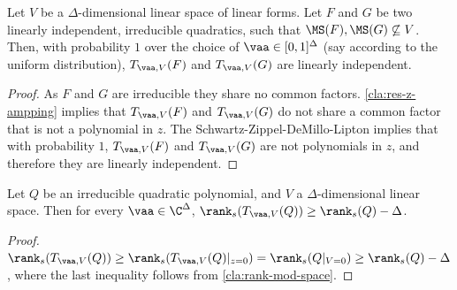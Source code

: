 \begin{corollary}\label{cla:still-indep}
	Let $V$ be a $\Delta$-dimensional linear space of linear forms. Let $F$ and  $G$ be two linearly independent, irreducible quadratics, such that $\MS(F),\MS(G)\not\subseteq V$. Then, with probability $1$ over the choice of $\vaa \in [0,1]^{\Delta}$ (say according to the uniform distribution), $T_{\vaa, V}(F)$ and $T_{\vaa, V}(G)$ are linearly independent.
\end{corollary}

\begin{proof}
	As $F$ and $G$ are irreducible  they share no common factors. \autoref{cla:res-z-ampping} implies that  $T_{\vaa, V}(F)$ and $T_{\vaa, V}(G)$ do not share a common factor that is not a polynomial in $z$.  The Schwartz-Zippel-DeMillo-Lipton implies that with probability $1$,   $T_{\vaa, V}(F)$ and $T_{\vaa, V}(G)$ are not polynomials in $z$, and therefore they are linearly independent.
\end{proof}

\begin{claim}\label{cla:z-map-rank}
Let $Q$ be an irreducible quadratic polynomial, and $V$  a $\Delta$-dimensional linear space.
Then for every $\vaa \in \C^{\Delta}$,  $\rank_s(T_{\vaa, V}(Q)) \geq \rank_s(Q)-\Delta$.
\end{claim}
\begin{proof}
$\rank_s(T_{\vaa, V}(Q)) \geq \rank_s(T_{\vaa, V}(Q)|_{z=0}) = \rank_s(Q|_{V=0}) \geq \rank_s(Q)-\Delta$, where the last inequality follows from \autoref{cla:rank-mod-space}.
\end{proof}

